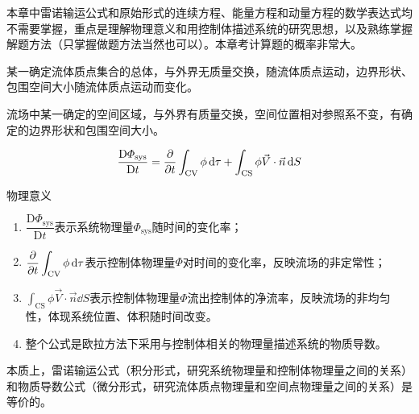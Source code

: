 
\begin{tip}
	本章中雷诺输运公式和原始形式的连续方程、能量方程和动量方程的数学表达式均不需要掌握，重点是理解物理意义和用控制体描述系统的研究思想，以及熟练掌握解题方法（只掌握做题方法当然也可以）。本章考计算题的概率非常大。
\end{tip}


\begin{definition}[系统]
	某一确定流体质点集合的总体，与外界无质量交换，随流体质点运动，边界形状、包围空间大小随流体质点运动而变化。
\end{definition}

\begin{definition}[控制体]
	流场中某一确定的空间区域，与外界有质量交换，空间位置相对参照系不变，有确定的边界形状和包围空间大小。
\end{definition}


\begin{equation}
	\dfrac{\mathrm{D} \varPhi_{\text{sys}}}{\mathrm{D} t} = \pdv{t} \int_{\text{CV}} \phi \dd{\tau} + \int_{\text{CS}} \phi \vec{V} \cdot \vec{n} \dd{S}
\end{equation}

物理意义

\begin{enumerate}
	\item $\dfrac{\mathrm{D} \varPhi_{\text{sys}}}{\mathrm{D} t}$表示系统物理量$\varPhi_{\text{sys}}$随时间的变化率；
	\vskip 0.1cm
	\item $\displaystyle \pdv{t} \int_{\text{CV}} \phi \dd{\tau}$表示控制体物理量$\varPhi$对时间的变化率，反映流场的非定常性；
	\vskip 0.1cm
	\item $\displaystyle \int_{\text{CS}} \phi \vec{V} \cdot \vec{n} \dd{S}$表示控制体物理量$\varPhi$流出控制体的净流率，反映流场的非均匀性，体现系统位置、体积随时间改变。
	\item 整个公式是欧拉方法下采用与控制体相关的物理量描述系统的物质导数。
\end{enumerate}

\begin{tip}
	本质上，雷诺输运公式（积分形式，研究系统物理量和控制体物理量之间的关系）和物质导数公式（微分形式，研究流体质点物理量和空间点物理量之间的关系）是等价的。
\end{tip}


